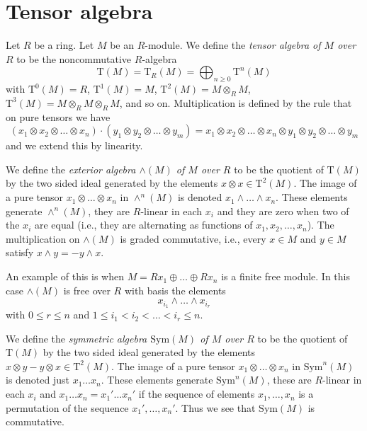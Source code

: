 \section{Tensor algebra}
\label{section-tensor-algebra}

\noindent
Let $R$ be a ring. Let $M$ be an $R$-module.
We define the {\it tensor algebra of $M$ over $R$} to
be the noncommutative $R$-algebra
$$
\text{T}(M) = \text{T}_R(M) =
\bigoplus\nolimits_{n \geq 0} \text{T}^n(M)
$$
with
$\text{T}^0(M) = R$,
$\text{T}^1(M) = M$,
$\text{T}^2(M) = M \otimes_R M$,
$\text{T}^3(M) = M \otimes_R M \otimes_R M$, and so on.
Multiplication is defined by the rule that on pure tensors we have
$$
(x_1 \otimes x_2 \otimes \ldots \otimes x_n)
\cdot
(y_1 \otimes y_2 \otimes \ldots \otimes y_m)
=
x_1 \otimes x_2 \otimes \ldots \otimes x_n \otimes
y_1 \otimes y_2 \otimes \ldots \otimes y_m
$$
and we extend this by linearity.

\medskip\noindent
We define the {\it exterior algebra $\wedge(M)$ of $M$ over $R$}
to be the quotient of $\text{T}(M)$ by the two sided
ideal generated by the elements $x \otimes x \in \text{T}^2(M)$.
The image of a pure tensor $x_1 \otimes \ldots \otimes x_n$
in $\wedge^n(M)$ is denoted $x_1 \wedge \ldots \wedge x_n$.
These elements generate $\wedge^n(M)$, they are $R$-linear
in each $x_i$ and they are zero when two of the $x_i$ are equal
(i.e., they are alternating as functions of
$x_1, x_2, \ldots, x_n$). The multiplication on $\wedge(M)$ is
graded commutative, i.e., every $x \in M$ and $y \in M$
satisfy $x \wedge y = - y \wedge x$.

\medskip\noindent
An example of this is when $M = Rx_1 \oplus \ldots \oplus Rx_n$
is a finite free module. In this case $\wedge(M)$ is free over
$R$ with basis the elements
$$
x_{i_1} \wedge \ldots \wedge x_{i_r}
$$
with $0 \leq r \leq n$ and $1 \leq i_1 < i_2 < \ldots < i_r \leq n$.

\medskip\noindent
We define the {\it symmetric algebra $\text{Sym}(M)$ of $M$ over $R$}
to be the quotient of $\text{T}(M)$ by the two sided
ideal generated by the elements $x \otimes y - y \otimes x \in \text{T}^2(M)$.
The image of a pure tensor $x_1 \otimes \ldots \otimes x_n$
in $\text{Sym}^n(M)$ is denoted just $x_1 \ldots x_n$.
These elements generate $\text{Sym}^n(M)$, these are $R$-linear
in each $x_i$ and $x_1 \ldots x_n = x_1' \ldots x_n'$ if the
sequence of elements $x_1, \ldots, x_n$ is a permutation of the
sequence $x_1', \ldots, x_n'$. Thus we see that $\text{Sym}(M)$
is commutative.


